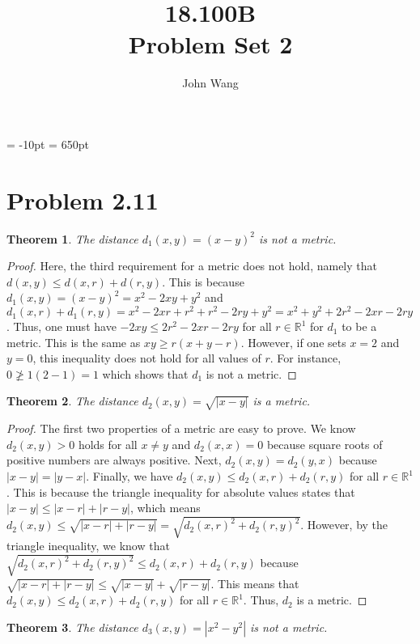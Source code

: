 \documentclass[psamsfonts]{amsart}
\title{18.100B \\
Problem Set 2}
\author{John Wang}
\newtheorem{thm}{Theorem}[section]
\theoremstyle{definition}
\theoremstyle{remark}
\numberwithin{equation}{section}
\begin{document}
\maketitle

\voffset = -10pt
\textheight = 650pt

\section{Problem 2.11}

\begin{thm}
The distance $d_1(x,y) = (x-y)^2$ is not a metric.
\end{thm}

\begin{proof}
Here, the third requirement for a metric does not hold, namely that $d(x,y) \leq d(x,r) + d(r,y)$. This is because $d_1(x,y) = (x-y)^2 = x^2 - 2xy + y^2$ and $d_1(x,r) + d_1(r,y) = x^2 - 2xr + r^2 +r^2 - 2ry + y^2 = x^2 + y^2 + 2r^2 - 2xr - 2ry$. Thus, one must have $-2xy \leq 2r^2 - 2xr - 2ry$ for all $r \in \mathbb{R}^1$ for $d_1$ to be a metric. This is the same as $xy \geq r(x+y-r)$. However, if one sets $ x = 2$ and $ y = 0$, this inequality does not hold for all values of $r$. For instance, $ 0 \not\geq 1 ( 2 - 1) = 1 $ which shows that $d_1$ is not a metric. 
\end{proof}

\begin{thm}
The distance $d_2(x,y) = \sqrt{|x-y |}$ is a metric.
\end{thm}

\begin{proof}
The first two properties of a metric are easy to prove. We know $d_2(x,y) > 0$ holds for all $x \neq y$ and $d_2(x,x) = 0$ because square roots of positive numbers are always positive. Next, $d_2(x,y) = d_2(y,x)$ because $|x - y| = |y-x|$. Finally, we have $ d_2(x,y) \leq d_2(x,r) + d_2(r,y)$ for all $r \in \mathbb{R}^1$. This is because the triangle inequality for absolute values states that $|x-y| \leq |x-r| + |r-y|$, which means $d_2(x,y) \leq \sqrt{|x-r| + |r-y|} = \sqrt{ d_2(x,r)^2 + d_2(r,y)^2}$. However, by the triangle inequality, we know that $ \sqrt{ d_2(x,r)^2 + d_2(r,y)^2} \leq d_2(x,r) + d_2(r,y)$ because $\sqrt{|x-r| + |r-y|} \leq \sqrt{|x-y|} + \sqrt{|r-y|}$. This means that $d_2(x,y) \leq d_2(x,r) + d_2(r,y)$ for all $r \in \mathbb{R}^1$.  Thus, $d_2$ is a metric. 
\end{proof}

\begin{thm}
The distance $d_3(x,y) = |x^2 - y^2|$ is not a metric.
\end{thm}
\end{document}
